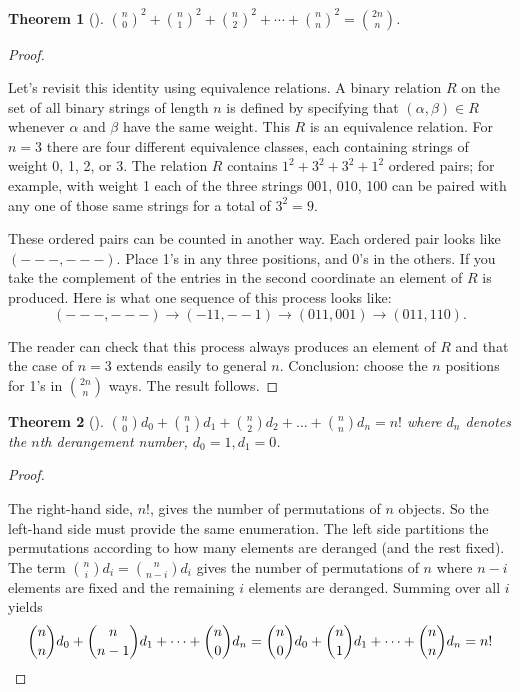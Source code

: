 \documentclass[10pt,]{book}
\theoremstyle{plain}
\newtheorem{theorem}{Theorem}[section]
\theoremstyle{definition}
\theoremstyle{definition}
\numberwithin{equation}{chapter}
\begin{document}
\begin{theorem}[{}]\label{theorem-21}
\hypertarget{p-322}{}%
\(\binom{n}{0}^{2} + \binom{n}{1}^{2} + \binom{n}{2}^{2} + \cdots + \binom{n}{n}^{2} = \binom{2n}{n}\).%
\end{theorem}
\begin{proof}\hypertarget{proof-19}{}
\hypertarget{p-323}{}%
Let's revisit this identity using equivalence relations. A binary relation \(R\) on the set of all binary strings of length \(n\) is defined by specifying that \((\alpha,\beta) \in R\) whenever \(\alpha\) and \(\beta\) have the same weight. This \(R\) is an equivalence relation. For \(n=3\) there are four different equivalence classes, each containing strings of weight 0, 1, 2, or 3. The relation \(R\) contains \(1^{2} + 3^{2} + 3^{2} + 1^{2}\) ordered pairs; for example, with weight 1 each of the three strings 001, 010, 100 can be paired with any one of those same strings for a total of \(3^{2} = 9\).%
\par
\hypertarget{p-324}{}%
These ordered pairs can be counted in another way. Each ordered pair looks like \((- - -,- - -)\).  Place 1's in any three positions, and 0's in the others.  If you take the complement of the entries in the second coordinate an element of \(R\) is produced. Here is what one sequence of this process looks like:%
\begin{equation*}
(- - -, - - -) \rightarrow (- 11,- - 1) \rightarrow (011,001) \rightarrow (011,110)\text{.}
\end{equation*}
%
\par
\hypertarget{p-325}{}%
The reader can check that this process always produces an element of \(R\) and that the case of \(n=3\) extends easily to general \(n\). Conclusion: choose the \(n\) positions for 1's in \(\binom{2n}{n}\) ways. The result follows.%
\end{proof}
\begin{theorem}[{}]\label{theorem-22}
\hypertarget{p-326}{}%
\(\binom{n}{0} d_{0} + \binom{n}{1} d_{1} + \binom{n}{2} d_{2} + \ldots + \binom{n}{n} d_{n} = n!\) where \(d_{n}\) denotes the \(n\)th derangement number, \(d_{0} = 1,d_{1} = 0\).%
\end{theorem}
\begin{proof}\hypertarget{proof-20}{}
\hypertarget{p-327}{}%
The right-hand side, \(n!\), gives the number of permutations of \(n\) objects. So the left-hand side must provide the same enumeration. The left side partitions the permutations according to how many elements are deranged (and the rest fixed). The term \(\binom{n}{i} d_{i} = \binom{n}{n - i} d_{i}\) gives the number of permutations of \(n\) where \(n - i\) elements are fixed and the remaining \(i\) elements are deranged. Summing over all \(i\) yields%
\begin{equation*}
\binom{n}{n} d_{0} + \binom{n}{n - 1} d_{1} + \cdots + \binom{n}{0} d_{n} = \binom{n}{0} d_{0} + \binom{n}{1} d_{1} + \cdots + \binom{n}{n} d_{n} = n!\qedhere
\end{equation*}
%
\end{proof}
\end{document}
